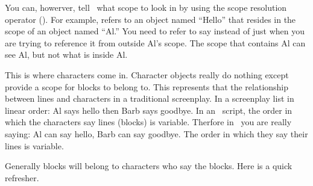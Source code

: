 \documentclass{book}
\begin{document}
You can, howerver, tell \SSquared\ what scope to look in by using the scope resolution operator (\SSCode{:}).  For example,  refers to an object named ``Hello'' that resides in the scope of an object named ``Al.''  You need to refer to say  instead of just  when you are trying to reference it from outside Al's scope.  The scope that contains Al can see Al, but not what is inside Al.

This is where characters come in.  Character objects really do nothing except provide a scope for blocks to belong to.  This represents that the relationship between lines and characters in a traditional screenplay.  In a screenplay list in linear order: Al says hello then Barb says goodbye.  In an \SSquared\ script, the order in which the characters say lines (blocks) is variable.  Therfore in \SSquared\ you are really saying: Al can say hello, Barb can say goodbye.  The order in which they say their lines is variable.

Generally blocks will belong to characters who say the blocks.  Here is a quick refresher.

\begin{SSCodeBox}
\scitek{/*} \\
 \\
 \\
 \\
\scitek{*/}
\scitea{} \\
\scitea{} \\
\scitea{} \\
  \\
 \\
\scitea{} \\
\scitea{} \\
\scitea{} \\
\scitea{\{} \\
\scitea{\hspace*{4em}}
\scitea{;} \\
\scitea{\}} \\
\scitea{} \\
\scitea{\{} \\
\scitea{\hspace*{4em}}
\scitea{;} \\
\scitea{\}} \\
\scitea{} \\
\end{SSCodeBox}
\end{document}
